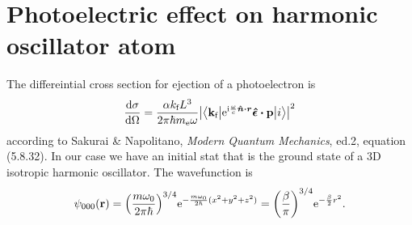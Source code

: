 \documentclass[11pt,letter, swedish, english
]{article}
\begin{document}
\section{Photoelectric effect on harmonic oscillator atom}
\newcommand{\kf}{k_{\text{f}}}
\newcommand{\vkf}{\vb{k}_{\text{f}}}
\newcommand{\vq}{\vb{q}}
The differeintial cross section for ejection of a photoelectron is
\begin{equation}
\dv{\sigma}{\Omega}=\frac{\alpha \kf L^3}{2\pi\hbar m_\ee\omega}
\abs{\mel**{\vkf}{\ee^{\ii\frac{\omega}{c}\vu*{n}\vdot\vb*{r}}
\vu*{\epsilon}\vdot\vb{p}}{i}}^2 
\end{equation}
according to Sakurai \& Napolitano,
\textit{Modern Quantum Mechanics}, ed.2, equation (5.8.32). In our
case we have an initial stat that is the ground state of a 3D
isotropic harmonic oscillator. The wavefunction is
\begin{equation}
\psi_{000}(\vb{r})=\qty(\frac{m\omega_0}{2\pi\hbar})^{3/4}
\mathrm{e}^{-\frac{m\omega_0}{2\hbar}(x^2+y^2+z^2)}
=\qty(\frac{\beta}{\pi})^{3/4}\mathrm{e}^{-\frac{\beta}{2}r^2}.
\end{equation}
\end{document}
